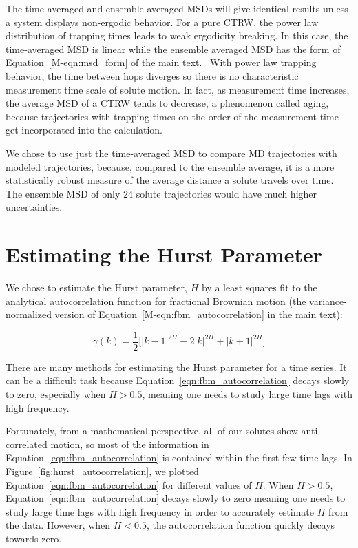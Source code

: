 \documentclass{article}
\begin{document}
  The time averaged and ensemble averaged MSDs will give identical results 
  unless a system displays non-ergodic behavior. For a pure CTRW, the power 
  law distribution of trapping times leads to weak ergodicity breaking.
  In this case, the time-averaged MSD is linear while the ensemble averaged
  MSD has the form of Equation~\ref{M-eqn:msd_form} of the main text.~\cite{meroz_toolbox_2015} With
  power law trapping behavior, the time between hops diverges so there is no 
  characteristic measurement time scale of solute motion. In fact, as measurement 
  time increases, the average MSD of a CTRW tends to decrease, a phenomenon called
  aging, because trajectories with trapping times on the order of the measurement 
  time get incorporated into the calculation.~\cite{bel_weak_2005}
  
  We chose to use just the time-averaged MSD to compare MD trajectories with
  modeled trajectories, because, compared to the ensemble average, it is a more
  statistically robust measure of the average distance a solute travels over
  time. The ensemble MSD of only 24 solute trajectories would have much higher
  uncertainties.
  
  \section{Estimating the Hurst Parameter}\label{section:H_estimate}
  
  We chose to estimate the Hurst parameter, $H$ by a least squares fit to the analytical
  autocorrelation function for fractional Brownian motion (the variance-normalized version 
  of Equation~\ref{M-eqn:fbm_autocorrelation} in the main text):
  
  \begin{equation}
    \gamma(k) = \dfrac{1}{2}\bigg[|k-1|^{2H} - 2|k|^{2H} + |k+1|^{2H}\bigg]
  \label{eqn:fbm_autocorrelation}
  \end{equation}  
  
  There are many methods for estimating the Hurst parameter for a time series.
  \cite{clegg_practical_2006} It can be a difficult task because 
  Equation~\ref{eqn:fbm_autocorrelation} decays slowly to zero, especially when 
  $H > 0.5$, meaning one needs to study large time lags with high frequency.
  
  Fortunately, from a mathematical perspective, all of our solutes show anti-correlated
  motion, so most of the information in Equation~\ref{eqn:fbm_autocorrelation} is contained
  within the first few time lags. In Figure~\ref{fig:hurst_autocorrelation}, we plotted
  Equation~\ref{eqn:fbm_autocorrelation} for different values of $H$. When $H > 0.5$, 
  Equation~\ref{eqn:fbm_autocorrelation} decays slowly to zero meaning one needs to study
  large time lags with high frequency in order to accurately estimate $H$ from the data. 
  However, when $H < 0.5$, the autocorrelation function quickly decays towards zero.
\end{document}
